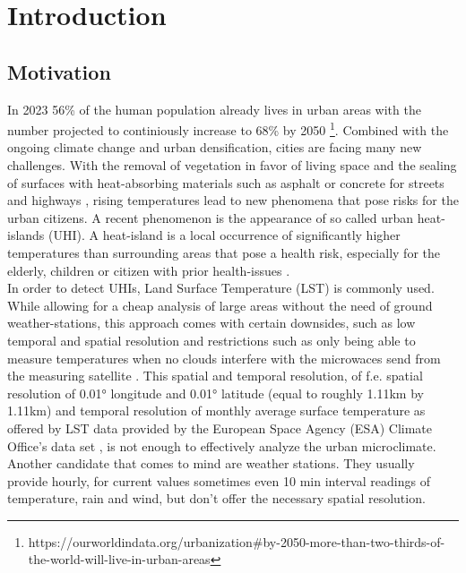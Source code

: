 
\chapter{Introduction}
\label{chap:Introduction}

\section{Motivation}

 In 2023 56\% of the human population already lives in urban areas with the number projected to continiously increase to 68\% by 2050 \footnote{https://ourworldindata.org/urbanization\#by-2050-more-than-two-thirds-of-the-world-will-live-in-urban-areas}. Combined with the ongoing climate change and urban densification, cities are facing many new challenges. With the removal of vegetation in favor of living space and the sealing of surfaces with heat-absorbing materials such as asphalt or concrete for streets and highways \cite{gret2020urban}, rising temperatures lead to new phenomena that pose risks for the urban citizens. A recent phenomenon is the appearance of so called urban heat-islands (UHI). A heat-island is a local occurrence of significantly higher temperatures than surrounding areas that pose a health risk, especially for the elderly, children or citizen with prior health-issues \cite{martin2015alternative}.\\
In order to detect UHIs, Land Surface Temperature (LST) is commonly used. While allowing for a cheap analysis of large areas without the need of ground weather-stations, this approach comes with certain downsides, such as low temporal and spatial resolution and restrictions such as only being able to measure temperatures when no clouds interfere with the microwaces send from the measuring satellite \cite{zhang2015estimation}. This spatial and temporal resolution, of f.e. spatial resolution of 0.01° longitude and 0.01° latitude (equal to roughly 1.11km by 1.11km) and temporal resolution of monthly average surface temperature as offered by LST data provided by the European Space Agency (ESA) Climate Office's data set \cite{ghent2022esalst}, is not enough to effectively analyze the urban microclimate. Another candidate that comes to mind are weather stations. They usually provide hourly, for current values sometimes even 10 min interval readings of temperature, rain and wind, but don't offer the necessary spatial resolution.
